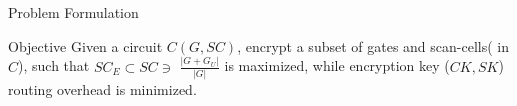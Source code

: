 \begin{frame}{Problem Formulation}
\begin{block}{Objective}
	Given a circuit $C(G,SC)$, encrypt a subset of gates and scan-cells( in $C$), such that $SC_E \subset SC \ni$  $\frac{|G + G_U|}{|G|}$ is maximized, while encryption key ($CK, SK$) routing overhead is minimized. 
\end{block}

\end{frame}
